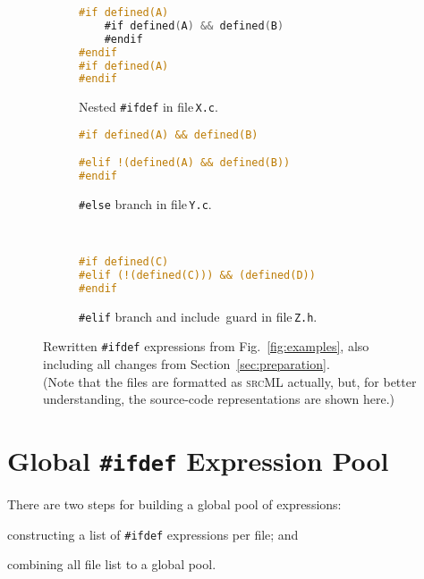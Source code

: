\documentclass[a4paper]{scrartcl}
\newcommand\code[1]{\texttt{#1}}
\newcommand\tool[1]{\textsc{#1}}
\newcommand\ifdeff[1]{\code{\##1}\xspace}
\newcommand\ifdef[0]{{\upshape\ifdeff{ifdef}}\xspace}
\begin{document}
\begin{figure}[ht]
        \centering
        \begin{subfigure}[t]{\textwidth}
					\begin{lstlisting}[language=C]
#if defined(A)
	#if defined(A) && defined(B)
	#endif
#endif
#if defined(A)
#endif
					\end{lstlisting}
					\caption{Nested \ifdef in file\,\code{X.c}.\vspace{1em}}
					\label{fig:examples2:a}
        \end{subfigure}
        \vspace{1em}
        \begin{subfigure}[t]{\textwidth}
					\begin{lstlisting}[language=C, firstnumber=5]
#if defined(A) && defined(B)

#elif !(defined(A) && defined(B))
#endif
					\end{lstlisting}
					\caption{\ifdeff{else} branch in file\,\code{Y.c}.}
					\label{fig:examples2:b}
        \end{subfigure}
        \begin{subfigure}[t]{\textwidth}
					\begin{lstlisting}[language=C, firstnumber=8]


#if defined(C)
#elif (!(defined(C))) && (defined(D))
#endif

					\end{lstlisting}
					\caption{\ifdeff{elif} branch and include~guard in file\,\code{Z.h}.}
					\label{fig:examples2:c}
        \end{subfigure}
        
        \caption{Rewritten \ifdef expressions from Fig.\ \ref{fig:examples}, also including all changes from Section~\ref{sec:preparation}.\\
        				{\footnotesize (Note that the files are formatted as \tool{srcML} actually, but, for better understanding, the source-code representations are shown here.)}}
        \label{fig:examples2}
\end{figure}



\section{Global \ifdef Expression Pool}
\label{sec:pool}

There are two steps for building a global pool of expressions:
\begin{inparaenum}[\itshape 1\upshape)]
\item constructing a list of \ifdef expressions per file; and
\item combining all file list to a global pool.
\end{inparaenum}
\end{document}
